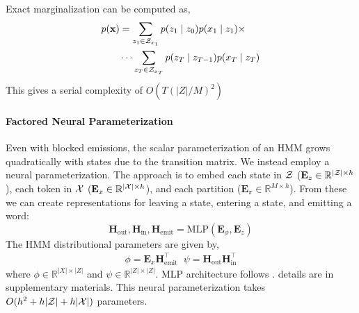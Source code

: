 \documentclass[11pt,a4paper]{article}
\begin{document}
Exact marginalization can be computed as,  
\begin{equation}
\label{eqn:sparse_marginalization}
\begin{aligned}
p(\mathbf{x}) &= \sum_{z_1 \in \mathcal{Z}_{x_1}} p(z_1\mid z_0)p(x_1 \mid z_1) \times\\
    &\cdots
    \sum_{z_T \in \mathcal{Z}_{x_T}} p(z_T \mid z_{T-1})p(x_T \mid z_T)
\end{aligned}
\end{equation}
This gives a serial complexity of $O(T(|Z|/M)^2)$




\paragraph{Factored Neural Parameterization}

Even with blocked emissions, the scalar parameterization of an HMM grows quadratically
with states due to the transition matrix.
We instead employ a neural parameterization.
The approach is to embed each state in $\cal Z$ ($\mathbf{E}_z \in \mathbb{R}^{|\mathcal{Z}| \times h}$),
each token in $\cal X$ ($\mathbf{E}_x \in \mathbb{R}^{|\mathcal{X}| \times h}$),
and each partition ($\mathbf{E}_\pi \in \mathbb{R}^{M \times h}$).
From these we can create representations for leaving a state, entering a state,
and emitting a word: 
\[ \mathbf{H}_{\textrm{out}},\mathbf{H}_{\textrm{in}},\mathbf{H}_\textrm{emit}
 = \text{MLP}(\mathbf{E}_\phi, \mathbf{E}_z ) \] 
The HMM distributional parameters are given by,
\begin{equation}
\begin{aligned}
\phi = \mathbf{E}_x \mathbf{H}_\textrm{emit}^\top \;\; 
\psi = \mathbf{H}_\textrm{out} \mathbf{H}_\textrm{in}^\top
\end{aligned}
\end{equation}
where $\phi \in \mathbb{R}^{|X|\times|Z|}$ and
$\psi \in \mathbb{R}^{|Z|\times|Z|}$. MLP architecture follows \cite{kim2019cpcfg}. details are in supplementary materials. 
This neural parameterization takes $O(h^2 + h|\mathcal{Z}| + h|\mathcal{X}|)$ parameters.
\end{document}
